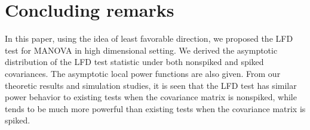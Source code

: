 \documentclass[12pt]{article} %
\theoremstyle{definition}
\begin{document}

\section{Concluding remarks}\label{concluding}
In this paper, using the idea of least favorable direction, we proposed the LFD test for MANOVA in high dimensional setting.
We derived the asymptotic distribution of the LFD test statistic under both nonspiked and spiked covariances.
The asymptotic local power functions are also given.
From our theoretic results and simulation studies, it is seen that the LFD test has similar power behavior to existing tests when the covariance matrix is nonspiked, while tends to be much more powerful than existing tests when the covariance matrix is spiked.
\end{document}
